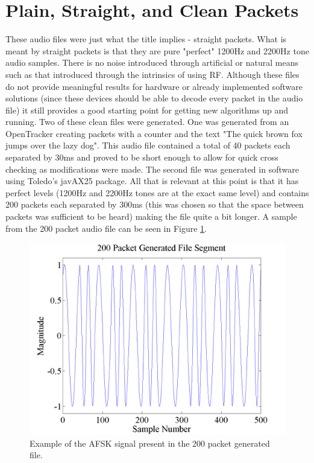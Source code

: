 \section{Plain, Straight, and Clean Packets}
These audio files were just what the title implies - straight packets. What is meant by straight packets is that they are pure "perfect" 1200Hz and 2200Hz tone audio samples. There is no noise introduced through artificial or natural means such as that introduced through the intrinsics of using RF. Although these files do not provide meaningful results for hardware or already implemented software solutions (since these devices should be able to decode every packet in the audio file) it still provides a good starting point for getting new algorithms up and running. Two of these clean files were generated. One was generated from an OpenTracker creating packets with a counter and the text "The quick brown fox jumps over the lazy dog". This audio file contained a total of 40 packets each separated by 30ms and proved to be short enough to allow for quick cross checking as modifications were made. The second file was generated in software using Toledo's javAX25 package. All that is relevant at this point is that it has perfect levels (1200Hz and 2200Hz tones are at the exact same level) and contains 200 packets each separated by 300ms (this was chosen so that the space between packets was sufficient to be heard) making the file quite a bit longer. A sample from the 200 packet audio file can be seen in Figure \ref{gen200Segment}.
\begin{figure}
  \centering
	\includegraphics[width=0.75\linewidth]{images/200PacketGeneratedFileSegment.png} 
	\caption{Example of the AFSK signal present in the 200 packet generated file.}
   \label{gen200Segment}
\end{figure}

